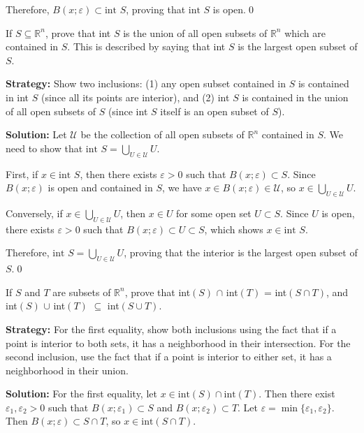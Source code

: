 Therefore, $B(x;\varepsilon) \subset \text{int } S$, proving that $\text{int } S$ is open.\qed


\begin{problembox}
If $S \subseteq \mathbb{R}^n$, prove that int $S$ is the union of all open subsets of $\mathbb{R}^n$ which are contained in $S$. This is described by saying that int $S$ is the largest open subset of $S$.
\end{problembox}

\noindent\textbf{Strategy:} Show two inclusions: (1) any open subset contained in $S$ is contained in int $S$ (since all its points are interior), and (2) int $S$ is contained in the union of all open subsets of $S$ (since int $S$ itself is an open subset of $S$).

\bigskip\noindent\textbf{Solution:} Let $\mathcal{U}$ be the collection of all open subsets of $\mathbb{R}^n$ contained in $S$. We need to show that $\text{int } S = \bigcup_{U \in \mathcal{U}} U$.

First, if $x \in \text{int } S$, then there exists $\varepsilon > 0$ such that $B(x;\varepsilon) \subset S$. Since $B(x;\varepsilon)$ is open and contained in $S$, we have $x \in B(x;\varepsilon) \in \mathcal{U}$, so $x \in \bigcup_{U \in \mathcal{U}} U$.

Conversely, if $x \in \bigcup_{U \in \mathcal{U}} U$, then $x \in U$ for some open set $U \subset S$. Since $U$ is open, there exists $\varepsilon > 0$ such that $B(x;\varepsilon) \subset U \subset S$, which shows $x \in \text{int } S$.

Therefore, $\text{int } S = \bigcup_{U \in \mathcal{U}} U$, proving that the interior is the largest open subset of $S$.\qed


\begin{problembox}
If $S$ and $T$ are subsets of $\mathbb{R}^n$, prove that
int$(S)$ $\cap$ int$(T)$ = int$(S \cap T)$,
and int$(S)$ $\cup$ int$(T)$ $\subseteq$ int$(S \cup T)$.
\end{problembox}    

\noindent\textbf{Strategy:} For the first equality, show both inclusions using the fact that if a point is interior to both sets, it has a neighborhood in their intersection. For the second inclusion, use the fact that if a point is interior to either set, it has a neighborhood in their union.

\bigskip\noindent\textbf{Solution:} For the first equality, let $x \in \text{int}(S) \cap \text{int}(T)$. Then there exist $\varepsilon_1, \varepsilon_2 > 0$ such that $B(x;\varepsilon_1) \subset S$ and $B(x;\varepsilon_2) \subset T$. Let $\varepsilon = \min\{\varepsilon_1, \varepsilon_2\}$. Then $B(x;\varepsilon) \subset S \cap T$, so $x \in \text{int}(S \cap T)$.

